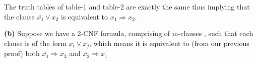 \documentclass{article}
\renewcommand\part[1]{\vspace{.10in}\textbf{(#1)}}
\begin{document}
  The truth tables of table-1 and table-2 are exactly the same thus implying that the clause $\bar{x_{1}} \vee x_{2}$ is equivalent to $x_{1} \Rightarrow x_{2}$. \newline

  \part{b} Suppose we have a 2-CNF formula, comprising of m-clauses , such that each clause is of the form $x_{i} \vee x_{j}$, which means it is equivalent to (from our previous proof) both $\bar{x_{1}} \Rightarrow x_{2}$ and $\bar{x_{2}} \Rightarrow x_{1}$
\end{document}
